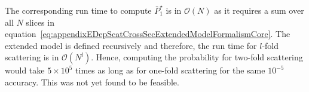 The corresponding run time to compute $\bar{P}^{\star}_1$ is in $\mathcal{O}(N)$ as it requires a sum over all $N$ slices in equation~\ref{eq:appendixEDepScatCrossSecExtendedModelFormalismCore}. The extended model is defined recursively and therefore, the run time for $l$-fold scattering is in $\mathcal{O}(N^l)$. Hence, computing the probability for two-fold scattering would take $5\times10^5$ times as long as for one-fold scattering for the same $10^{-5}$ accuracy. This was not yet found to be feasible.
\FloatBarrier